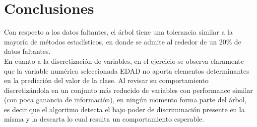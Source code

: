 \documentclass[]{article}
\begin{document}
\section*{Conclusiones}
Con respecto a los datos faltantes, el árbol tiene una tolerancia similar a la mayoría de métodos estadísticos, en donde se admite al rededor de un 20\% de datos faltantes. \\
En cuanto a la discretización de variables, en el ejercicio se observa claramente que la variable numérica seleccionada EDAD no aporta elementos determinantes en la predicción del valor de la clase. Al revisar su comportamiento discretizándola en un conjunto más reducido de variables con performance similar (con poca ganancia de información), en ningún momento forma parte del árbol, es decir que el algoritmo detecta el bajo poder de discriminación presente en la misma y la descarta lo cual resulta un comportamiento esperable.




	




\end{document}
